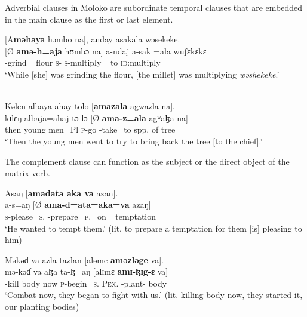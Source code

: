 Adverbial clauses in Moloko are subordinate temporal clauses that are embedded in the main clause as the first  or last  element. 

\clearpage
\ea\label{ex:7:173}
{}[A\textbf{məhaya}  həmbo  na],  anday  asakala  wəsekeke.\\
\gll  {}[Ø  \textbf{amə-h}\textbf{=aja}  hʊmbɔ  na]  a-ndaj    a-sak    =ala  wuʃɛkɛkɛ\\
      {} {\DEP}-grind={\PLU}  flour  {\PSP}  \textsc{s}-{\PRG}    \textsc{s}-multiply  =to  \textsc{id}:multiply\\
\glt  ‘While [she] was grinding the flour, [the millet] was multiplying \textit{wəshekeke}.’\\
\z 

\ea\label{ex:7:174} \\
Kəlen  albaya  ahay  tolo  [\textbf{amazala}  agwazla  na].\\
\gll  kɪlɛŋ  albaja=ahaj  tɔ-lɔ  [Ø \textbf{ama-z=ala}  agʷaɮa    na]\\
      then    {young men}=Pl  \textsc{p}-go   {}  {\DEP}-take=to  {spp. of tree}  {\PSP}\\
\glt  ‘Then the young men went to try to bring back the tree [to the chief].’\\
\z 

The complement clause can function as the subject  or the direct object  of the matrix verb.

\ea\label{ex:7:175}
Asaŋ  [\textbf{amadata  aka  va}  azan].\\
\gll  a-s=aŋ     [Ø   \textbf{ama-d=ata=aka=va }  azaŋ]\\
      \textsc{s}-please=\textsc{s}.{\IO}  {}  {\DEP}-prepare=\textsc{p}.{\IO}=on={\PRF}  temptation\\
\glt  ‘He wanted to tempt them.’ (lit. to prepare a temptation for them [is] pleasing to him)\\
\z 

\ea\label{ex:7:176}
Məkəɗ  va  azla  tazlan  [aləme  \textbf{aməzləge}  va].\\
\gll  mə-kəɗ  va   aɮa  ta-ɮ=aŋ     [alɪmɛ  \textbf{amɪ-ɮɪg-ɛ}  va]\\
    {\NOM}-kill  body   now  \textsc{p}-begin=\textsc{s}.{\IO}   \textsc{Pex}.{\POSS}   {\DEP}-plant-{\CL}  body\\
\glt  ‘Combat now, they began to fight with us.’ (lit. killing body now, they started it, our planting bodies)\\
\z 
